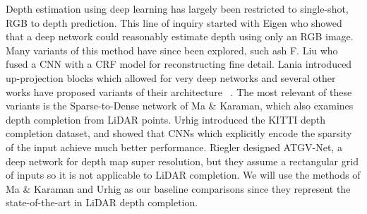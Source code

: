 Depth estimation using deep learning has largely been restricted to single-shot, RGB to depth prediction. This line of inquiry started with Eigen \etal who showed that a deep network could reasonably estimate depth using only an RGB image. Many variants of this method have since been explored, such ash F. Liu \etal who fused a CNN with a CRF model for reconstructing fine detail. Lania \etal introduced up-projection blocks which allowed for very deep networks and several other works have proposed variants of their architecture ~\cite{}. The most relevant of these variants is the Sparse-to-Dense network of Ma \& Karaman, which also examines depth completion from LiDAR points. Urhig \etal introduced the KITTI depth completion dataset, and showed that CNNs which explicitly encode the sparsity of the input achieve much better performance. Riegler \etal designed ATGV-Net, a deep network for depth map super resolution, but they assume a rectangular grid of inputs so it is not applicable to LiDAR completion. We will use the methods of Ma \& Karaman and Urhig \etal as our baseline comparisons since they represent the state-of-the-art in LiDAR depth completion.